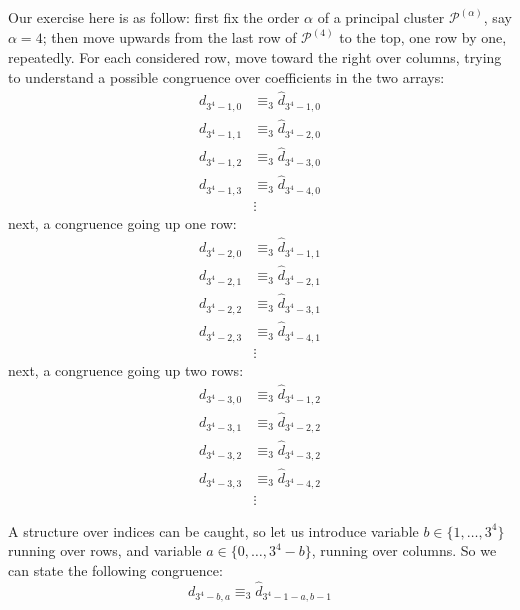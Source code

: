 Our exercise here is as follow: first fix the order $\alpha$ of a principal
cluster $\mathcal{P}^{(\alpha)}$, say $\alpha=4$; then move upwards from the
last row of $\mathcal{P}^{(4)}$ to the top, one row by one, repeatedly. For
each considered row, move toward the right over columns, trying to understand a
possible congruence over coefficients in the two arrays:
\begin{displaymath}
    \begin{split}
        d_{3^4 -1,0} &\equiv_{3} \hat{d}_{3^4 -1,0} \\
        d_{3^4 -1,1} &\equiv_{3} \hat{d}_{3^4 -2,0} \\
        d_{3^4 -1,2} &\equiv_{3} \hat{d}_{3^4 -3,0} \\
        d_{3^4 -1,3} &\equiv_{3} \hat{d}_{3^4 -4,0} \\
        &\vdots
    \end{split}
\end{displaymath}
next, a congruence going up one row:
\begin{displaymath}
    \begin{split}
        d_{3^4 -2,0} &\equiv_{3} \hat{d}_{3^4 -1,1} \\
        d_{3^4 -2,1} &\equiv_{3} \hat{d}_{3^4 -2,1} \\
        d_{3^4 -2,2} &\equiv_{3} \hat{d}_{3^4 -3,1} \\
        d_{3^4 -2,3} &\equiv_{3} \hat{d}_{3^4 -4,1} \\
        &\vdots
    \end{split}
\end{displaymath}
next, a congruence going up two rows:
\begin{displaymath}
    \begin{split}
        d_{3^4 -3,0} &\equiv_{3} \hat{d}_{3^4 -1,2} \\
        d_{3^4 -3,1} &\equiv_{3} \hat{d}_{3^4 -2,2} \\
        d_{3^4 -3,2} &\equiv_{3} \hat{d}_{3^4 -3,2} \\
        d_{3^4 -3,3} &\equiv_{3} \hat{d}_{3^4 -4,2} \\
        &\vdots
    \end{split}
\end{displaymath}

A structure over indices can be caught, so let us introduce variable
$b\in\lbrace1,\ldots,3^{4}\rbrace$ running over rows, and variable
$a\in\lbrace 0,\ldots,3^{4}-b\rbrace$, running over columns. So we can state the following 
congruence:
\begin{equation}
    \label{eq:pascal:arrays:congruence:rows:cols}
    d_{3^4 -b,a} \equiv_{3} \hat{d}_{3^4 -1-a,b-1} 
\end{equation}

